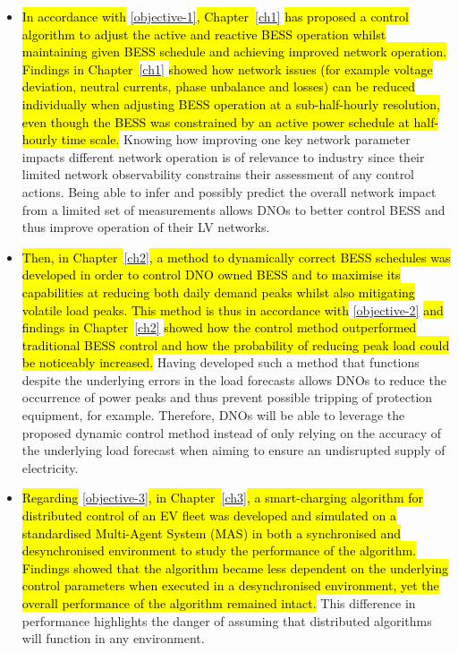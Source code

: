 \begin{itemize}
	\item
	\hl{In accordance with }\ref{objective-1}\hl{, Chapter~}\ref{ch1}\hl{ has proposed a control algorithm to adjust the active and reactive BESS operation whilst maintaining given BESS schedule and achieving improved network operation.
	Findings in Chapter~}\ref{ch1}\hl{ showed how network issues (for example voltage deviation, neutral currents, phase unbalance and losses) can be reduced individually when adjusting BESS operation at a sub-half-hourly resolution, even though the BESS was constrained by an active power schedule at half-hourly time scale.}
	Knowing how improving one key network parameter impacts different network operation is of relevance to industry since their limited network observability constrains their assessment of any control actions.
	Being able to infer and possibly predict the overall network impact from a limited set of measurements allows DNOs to better control BESS and thus improve operation of their LV networks.
	\item
	\hl{Then, in Chapter~}\ref{ch2}\hl{, a method to dynamically correct BESS schedules was developed in order to control DNO owned BESS and to maximise its capabilities at reducing both daily demand peaks whilst also mitigating volatile load peaks.
	This method is thus in accordance with }\ref{objective-2}\hl{ and findings in Chapter~}\ref{ch2}\hl{ showed how the control method outperformed traditional BESS control and how the probability of reducing peak load could be noticeably increased.}
	Having developed such a method that functions despite the underlying errors in the load forecasts allows DNOs to reduce the occurrence of power peaks and thus prevent possible tripping of protection equipment, for example.
	Therefore, DNOs will be able to leverage the proposed dynamic control method instead of only relying on the accuracy of the underlying load forecast when aiming to ensure an undisrupted supply of electricity.
	\item
	\hl{Regarding }\ref{objective-3}\hl{, in Chapter~}\ref{ch3}\hl{, a smart-charging algorithm for distributed control of an EV fleet was developed and simulated on a standardised Multi-Agent System (MAS) in both a synchronised and desynchronised environment to study the performance of the algorithm.
	Findings showed that the algorithm became less dependent on the underlying control parameters when executed in a desynchronised environment, yet the overall performance of the algorithm remained intact.}
	This difference in performance highlights the danger of assuming that distributed algorithms will function in any environment.

\end{itemize}
